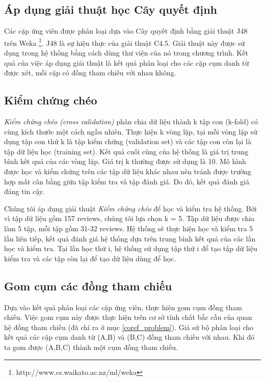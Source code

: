 \documentclass[12pt]{report}
\begin{document}
			\subsection*{Áp dụng giải thuật học Cây quyết định}
				\par Các cặp ứng viên được phân loại dựa vào Cây quyết định bằng giải thuật J48 trên Weka \footnote{http://www.cs.waikato.ac.nz/ml/weka}. J48 là sự hiện thực của giải thuật C4.5. Giải thuật này được sử dụng trong hệ thống bằng cách dùng thư viện của nó trong chương trình. Kết quả của việc áp dụng giải thuật là kết quả phân loại cho các cặp cụm danh từ được xét, mỗi cặp có đồng tham chiếu với nhau không.

			\subsection*{Kiểm chứng chéo}
				\par \textit{Kiểm chứng chéo (cross validation)} phân chia dữ liệu thành k tập con (k-fold) có cùng kích thước một cách ngẫu nhiên. Thực hiện k vòng lặp, tại mỗi vòng lặp sử dụng tập con thứ k là tập kiểm chứng (validation set) và các tập con còn lại là tập dữ liệu học (training set). Kết quả cuối cùng của hệ thống là giá trị trung bình kết quả của các vòng lặp. Giá trị k thường được sử dụng là 10. Mô hình được học và kiểm chứng trên các tập dữ liệu khác nhau nên tránh được trường hợp mất cân bằng giữa tập kiểm tra và tập đánh giá. Do đó, kết quả đánh giá đáng tin cậy.
				\par Chúng tôi áp dụng giải thuật \textit{Kiểm chứng chéo} để học và kiểm tra hệ thống. Bởi vì tập dữ liệu gồm 157 reviews, chúng tôi lựa chọn k = 5. Tập dữ liệu được chia làm 5 tập, mỗi tập gồm 31-32 reviews. Hệ thống sẽ thực hiện học và kiểm tra 5 lần liên tiếp, kết quả đánh giá hệ thống dựa trên trung bình kết quả của các lần học và kiểm tra. Tại lần học thứ i, hệ thống sử dụng tập thứ i để tạo tập dữ liệu kiểm tra và các tập còn lại để tạo dữ liệu dùng để học.

			\subsection*{Gom cụm các đồng tham chiếu}	
				\par Dựa vào kết quả phân loại các cặp ứng viên, thực hiện gom cụm đồng tham chiếu. Việc gom cụm này được thực hiện trên cơ sở tính chất bắc cầu của quan hệ đồng tham chiếu (đã chỉ ra ở mục \ref{coref_problem}). Giả sử bộ phân loại cho kết quả các cặp cụm danh từ (A,B) và (B,C) đồng tham chiếu với nhau. Khi đó ta gom được (A,B,C) thành một cụm đồng tham chiếu.	
\end{document}
